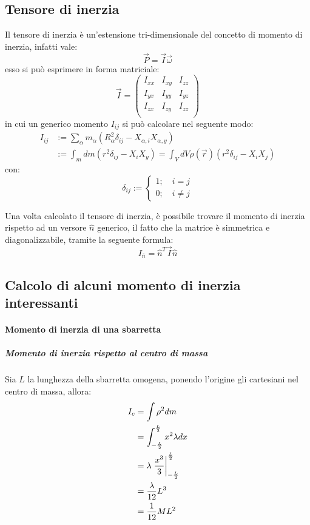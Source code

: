 \documentclass[11pt, a4paper, openright]{book}
\theoremstyle{plain}
\theoremstyle{definition}
\begin{document}
\subsection{Tensore di inerzia}
Il tensore di inerzia è un'estensione tri-dimensionale del concetto di momento di inerzia, infatti vale:
\begin{equation}
    \vec{P} = \vec{I}\vec{\omega}
\end{equation}
esso si può esprimere in forma matriciale:
\begin{equation}
    \vec{I} = \begin{pmatrix}
        I_{xx} & I_{xy} & I_{zz} \\ 
        I_{yx} & I_{yy} & I_{yz} \\
        I_{zx} & I_{zy} & I_{zz} \\
    \end{pmatrix}
\end{equation}
in cui un generico momento $I_{ij}$ si può calcolare nel seguente modo:
\begin{align}
    I_{ij} & := \sum_{\alpha} m_\alpha \left(R^2_\alpha \delta_{ij} - X_{\alpha, i}X_{\alpha, y}\right) \\
    & := \int_m dm \left(r^2 \delta_{ij} - X_{i}X_{y}\right) = \int_{V} dV\rho(\vec{r})\left(r^2\delta_{ij} - X_iX_j\right)
\end{align} 
con:
\begin{equation}
    \delta_{ij} := \begin{cases}
        1; \quad i = j \\
        0; \quad i \not = j
    \end{cases}
\end{equation}

Una volta calcolato il tensore di inerzia, è possibile trovare il momento di inerzia rispetto ad un versore $\hat{n}$ generico, il fatto che la matrice è simmetrica e diagonalizzabile, tramite la seguente formula:
\begin{equation}
    I_{\hat{n}} = \hat{n}^T \vec{I} \hat{n}
\end{equation}
\subsection{Calcolo di alcuni momento di inerzia interessanti}
\paragraph{Momento di inerzia di una sbarretta}
\subparagraph{Momento di inerzia rispetto al centro di massa}
Sia $L$ la lunghezza della sbarretta omogena, ponendo l'origine gli cartesiani nel centro di massa, allora:
\begin{align}
    I_c & = \int \rho^2dm \\ 
    & = \int_{-\frac{L}{2}}^{\frac{L}{2}} x^2 \lambda dx \\
    & = \lambda \eval{\frac{x^3}{3}}_{-\frac{L}{2}}^{\frac{L}{2}} \\
    & = \frac{\lambda}{12}L^3 \\
    & = \frac{1}{12}ML^2
\end{align}
\end{document}
